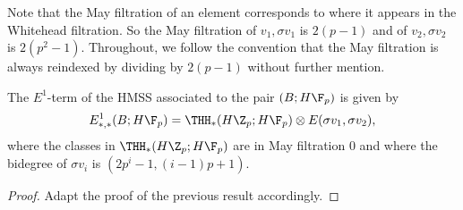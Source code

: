 \begin{comment}
Thus, we can rewrite the $E^2$-term as the homotopy groups of 
\[
 H\F_p\wedge_{H\Z_p\wedge \bbS[v_1,v_2]}\left(\THH(H\Z_p)\wedge \THH(\bbS[v_1,v_2])\right).
\]
Noting that $H\Z_p\cong H\Z_p\wedge \bbS$, $H\F_p\cong H\F_p\wedge \bbS$, and $H\F_p\cong H\F_p\wedge_{H\Z_p}H\Z_p$ we observe that, by commuting colimits with colimits, %
 this $E^1$-term can be computed as the homotopy groups of 
\[
(H\F_p\wedge_{H\Z_p} \THH(H\Z_p))\wedge (\bbS\wedge_{\bbS[v_1,v_2]}\THH(\bbS[v_1,v_2]))
\]
which itself is equivalent to 
\[
\THH(H\Z_p;H\F_p)\wedge \THH(\bbS[v_1,v_2];\bbS)\simeq \THH(H\Z_p;H\F_p)\wedge_{H\F_p}(H\F_p\wedge \THH(\bbS[v_1,v_2];\bbS))
\]
So we need to compute $H\F_p \wedge \THH(\bbS[v_1,v_2];\bbS)$. We have a B\"okstedt spectral sequence
\[
\HH_*(H_*(\bbS[v_1,v_2]); H_*(\bbS))\cong \HH_*(P(v_1,v_2); \F_p) 
\]
where 
\[ \HH_*(P(v_1,v_2); \F_p) \cong E(\sigma v_1, \sigma v_2)
\]
by Koszul duality.
Thus, there is an isomorphism
\[
\HH_*(H_*(\bbS[v_1,v_2]); H_*(\bbS)) = E(\sigma v_1, \sigma v_2).
\]
\end{comment}
\begin{rem}
Note that the May filtration of an element corresponds to where it appears in the Whitehead filtration. So the May filtration of $v_1, \sigma v_1$ is $2(p-1)$ and of $v_2, \sigma v_2$ is $2(p^2-1)$. Throughout, we follow the convention that the May filtration is always reindexed by dividing by $2(p-1)$ without further mention.
\end{rem}
\begin{comment}
By the K\"unneth isomorphism, the $E^1$-term is therefore
\[E^1_{*,*}(B,H\F_p)=THH_*(H\Z_p,H\F_p)\otimes E(\sigma v_1,\sigma v_2).\]
Note that the classes in $\THH_*(\Z_p;H\F_p)$ are in May filtration 0. With the reindexed form, $|\sigma v_1| = (2p-1, 1)$ and $|\sigma v_2| = (2p^2-1,p+1)$. Thus, we have shown the following. 
\end{comment}
\begin{lem}
	The $E^1$-term of the HMSS associated to the pair $(B;H\F_p)$ is given by 
	\[
	E^1_{*,*}(B;H\F_p) = \THH_*(H\Z_p;H\F_p)\otimes E(\sigma v_1, \sigma v_2), 
	\]
	where the classes in $\THH_*(H\Z_p;H\F_p)$ are in May filtration 0 and where the bidegree of $\sigma v_i$ is $(2p^i-1, (i-1)p+1)$.
\end{lem}
\begin{proof}
Adapt the proof of the previous result accordingly.
\end{proof}
